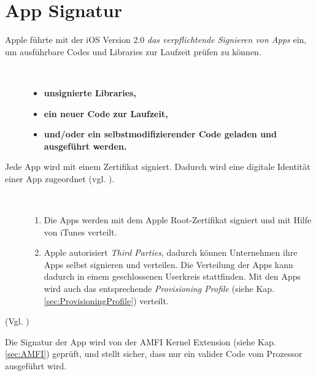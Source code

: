 \section{App Signatur}
\label{sec:SigningProcess}

Apple führte mit der iOS Version 2.0 \textit{\glqq das verpflichtende Signieren von Apps\grqq{}} ein, um ausführbare Codes und Libraries zur Laufzeit prüfen zu können. 
\begin{description}
    \item[\parbox{\textwidth} {Das Signieren einer App verhindert, dass}]~\par
    \begin{itemize}
        \item \textbf{unsignierte Libraries,}
        \item \textbf{ein neuer Code zur Laufzeit,} 
        \item \textbf{und/oder ein selbstmodifizierender Code geladen und ausgeführt werden.}
    \end{itemize}
\end{description} 
Jede App wird mit einem Zertifikat signiert. Dadurch wird eine digitale Identität einer App zugeordnet (vgl. \cite{Cert[2], Cert[3]}).
\begin{description}
    \item[\parbox{\textwidth} {Eine App kann auf zwei Arten signiert werden}]~\par
   \begin{enumerate}
        \item Die Apps werden mit dem Apple Root-Zertifikat signiert und mit Hilfe von iTunes verteilt. 
        
        \item Apple autorisiert \textit{\glqq Third Parties\grqq}, dadurch können Unternehmen ihre Apps selbst signieren und verteilen. Die Verteilung der Apps kann dadurch in einem geschlossenen Userkreis stattfinden. Mit den Apps wird auch das entsprechende \textit{\glqq Provisioning Profile\grqq{}} (siehe Kap. \ref{sec:ProvisioningProfile}) verteilt.
    \end{enumerate} 
\end{description} 
(Vgl. \cite{Sign[1], Sign[2], Sign[3], Sign[4], Sign[5], ROP[1]}) \par 
Die Signatur der App wird von der AMFI Kernel Extension (siehe Kap. \ref{sec:AMFI}) geprüft, und stellt sicher, dass nur ein valider Code vom Prozessor ausgeführt wird.    
 
